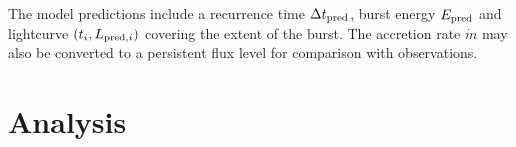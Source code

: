 \documentclass{aastex61}
\newcommand\aastex{AAS\TeX}
\begin{document}
The model predictions include a recurrence time $\Delta t_{\rm pred}$, burst energy $E_{\rm pred}$ and lightcurve $(t_i,L_{{\rm pred},i})$ covering the extent of the burst.
%
The accretion rate $\dot{m}$ may also be converted to a persistent flux level for comparison with observations.


%
%
%
%
%
%
%
%

\section{Analysis} 
\label{sec:analysis}
\end{document}
